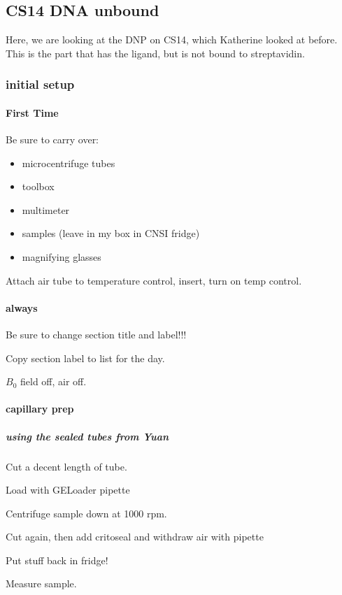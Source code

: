 \subsection{CS14 DNA unbound}\label{sec:dna_cs14_unbounddna}
\timeblockstart
{}
Here, we are looking at the DNP on CS14, which Katherine looked at before.
This is the part that has the ligand, but is not bound to streptavidin.

\subsubsection{initial setup}
\paragraph{First Time}
Be sure to carry over:
\begin{itemize}
    \item microcentrifuge tubes
    \item toolbox 
    \item multimeter 
    \item samples (leave in my box in CNSI fridge)
    \item magnifying glasses
\end{itemize}

Attach air tube to temperature control, insert, turn on temp control.

\paragraph{always}
Be sure to change section title and label!!!

Copy section label to list for the day.

$B_0$ field off, air off.

\paragraph{capillary prep}
\subparagraph{using the sealed tubes from Yuan}

Cut a decent length of tube.

Load with GELoader pipette

Centrifuge sample down at 1000 rpm.

Cut again, then add critoseal and withdraw air with pipette

Put stuff back in fridge!

Measure sample.

